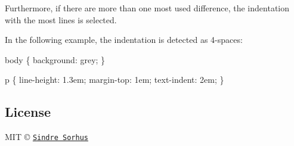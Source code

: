 Furthermore, if there are more than one most used difference, the indentation with the most lines is selected.

In the following example, the indentation is detected as 4-\/spaces\+:


\begin{DoxyCode}
body \{
  background: grey;
\}

p \{
    line-height: 1.3em;
    margin-top: 1em;
    text-indent: 2em;
\}
\end{DoxyCode}


\subsection*{License}

M\+IT © \href{http://sindresorhus.com}{\tt Sindre Sorhus} 